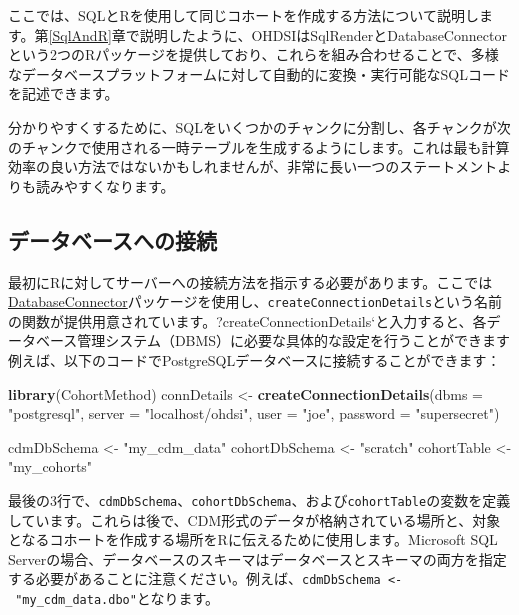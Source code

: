 \documentclass[
  11pt]{book}
\newenvironment{Shaded}{\begin{snugshade}}{\end{snugshade}}
\newcommand{\AttributeTok}[1]{\textcolor[rgb]{0.13,0.29,0.53}{#1}}
\newcommand{\FunctionTok}[1]{\textcolor[rgb]{0.13,0.29,0.53}{\textbf{#1}}}
\newcommand{\NormalTok}[1]{#1}
\newcommand{\OtherTok}[1]{\textcolor[rgb]{0.56,0.35,0.01}{#1}}
\newcommand{\StringTok}[1]{\textcolor[rgb]{0.31,0.60,0.02}{#1}}
\theoremstyle{definition}
\theoremstyle{definition}
\theoremstyle{definition}
\theoremstyle{definition}
\theoremstyle{remark}
\begin{document}
ここでは、SQLとRを使用して同じコホートを作成する方法について説明します。第\ref{SqlAndR}章で説明したように、OHDSIはSqlRenderとDatabaseConnectorという2つのRパッケージを提供しており、これらを組み合わせることで、多様なデータベースプラットフォームに対して自動的に変換・実行可能なSQLコードを記述できます。

分かりやすくするために、SQLをいくつかのチャンクに分割し、各チャンクが次のチャンクで使用される一時テーブルを生成するようにします。これは最も計算効率の良い方法ではないかもしれませんが、非常に長い一つのステートメントよりも読みやすくなります。

\subsection{データベースへの接続}\label{ux30c7ux30fcux30bfux30d9ux30fcux30b9ux3078ux306eux63a5ux7d9a-1}

最初にRに対してサーバーへの接続方法を指示する必要があります。ここでは\href{https://ohdsi.github.io/DatabaseConnector/}{DatabaseConnector}パッケージを使用し、\texttt{createConnectionDetails}という名前の関数が提供用意されています。?createConnectionDetails`と入力すると、各データベース管理システム（DBMS）に必要な具体的な設定を行うことができます例えば、以下のコードでPostgreSQLデータベースに接続することができます：

\begin{Shaded}
\begin{Highlighting}[]
\FunctionTok{library}\NormalTok{(CohortMethod)}
\NormalTok{connDetails }\OtherTok{\textless{}{-}} \FunctionTok{createConnectionDetails}\NormalTok{(}\AttributeTok{dbms =} \StringTok{"postgresql"}\NormalTok{,}
                                       \AttributeTok{server =} \StringTok{"localhost/ohdsi"}\NormalTok{,}
                                       \AttributeTok{user =} \StringTok{"joe"}\NormalTok{,}
                                       \AttributeTok{password =} \StringTok{"supersecret"}\NormalTok{)}

\NormalTok{cdmDbSchema }\OtherTok{\textless{}{-}} \StringTok{"my\_cdm\_data"}
\NormalTok{cohortDbSchema }\OtherTok{\textless{}{-}} \StringTok{"scratch"}
\NormalTok{cohortTable }\OtherTok{\textless{}{-}} \StringTok{"my\_cohorts"}
\end{Highlighting}
\end{Shaded}

最後の3行で、\texttt{cdmDbSchema}、\texttt{cohortDbSchema}、および\texttt{cohortTable}の変数を定義しています。これらは後で、CDM形式のデータが格納されている場所と、対象となるコホートを作成する場所をRに伝えるために使用します。Microsoft SQL Serverの場合、データベースのスキーマはデータベースとスキーマの両方を指定する必要があることに注意ください。例えば、\texttt{cdmDbSchema\ \textless{}-\ "my\_cdm\_data.dbo"}となります。
\end{document}
